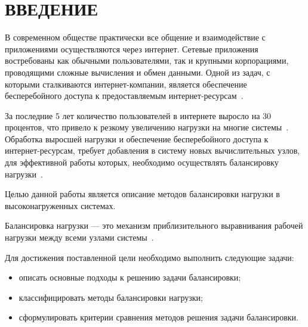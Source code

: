 \chapter*{ВВЕДЕНИЕ}

В современном обществе практически все общение и взаимодействие с приложениями осуществляются через интернет. 
Сетевые приложения востребованы как обычными пользователями, так и крупными корпорациями, проводящими сложные вычисления и обмен данными.
Одной из задач, с которыми сталкиваются интернет-компании, является обеспечение бесперебойного доступа к предоставляемым интернет-ресурсам~\cite{webact}.

За последние 5 лет количество пользователей в интернете выросло на 30 процентов, что привело к резкому увеличению нагрузки на многие системы~\cite{statistics}. Обработка выросшей нагрузки и обеспечение бесперебойного доступа к интернет-ресурсам, требует добавления в систему новых вычислительных узлов, для эффективной работы которых, необходимо осуществлять балансировку нагрузки~\cite{strategies, com_analysis, gaud, part_algos}.

Целью данной работы является описание методов балансировки нагрузки в высоконагруженных системах.

Балансировка нагрузки --- это механизм приблизительного выравнивания рабочей нагрузки между всеми узлами системы~\cite{anal, gaud}.

Для достижения поставленной цели необходимо выполнить следующие
задачи:
\begin{itemize}
	\item описать основные подходы к решению задачи балансировки;
	\item классифицировать методы балансировки нагрузки;
	\item сформулировать критерии сравнения методов решения задачи балансировки.
\end{itemize}

